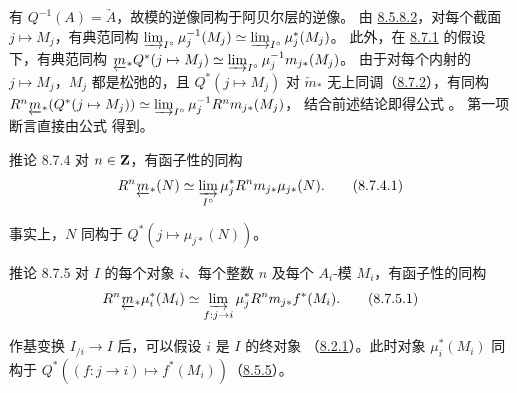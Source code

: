 有 $Q^{-1}(A)=\underrightarrow{A}$，故模的逆像同构于阿贝尔层的逆像。
由 \hyperref[VI.eq8.5.8.2]{8.5.8.2}，对每个截面 $j\mapsto M_j$，有典范同构
$\varinjlim_{I^{\circ}}\mu^{-1}_j(M_j)\simeq \varinjlim_{I^{\circ}}\mu^{\ast}_j(M_j)$。
此外，在 \hyperref[VI.subsubsec8.7.1]{8.7.1} 的假设下，有典范同构
$\underleftarrow{m}_{\ast}Q^{\ast}(j\mapsto M_j)\simeq \varinjlim_{I^{\circ}}\mu^{-1}_jm_{j\ast}(M_j)$。
由于对每个内射的 $j\mapsto M_j$，$M_j$ 都是松弛的，且 $Q^{\ast}(j\mapsto M_j)$
对 $\underleftarrow{m}_{\ast}$ 无上同调（\hyperref[VI.lem8.7.2]{8.7.2}），有同构
$R^n\underleftarrow{m}_{\ast}(Q^{\ast}(j\mapsto M_j))\simeq \varinjlim_{I^{\circ}}\mu^{-1}_jR^nm_{j\ast}(M_j)$，
结合前述结论即得公式 。
第一项断言直接由公式  得到。

\begin{enonce*}{推论 8.7.4}
对\pageoriginale{} $n\in\mathbf{Z}$，有函子性的同构
\begin{equation*}
R^n \underleftarrow{m}_{\ast} (N) \simeq \varinjlim_{I^{\circ}}
\mu^{\ast}_j R^n m_{j\ast} \mu_{j\ast} (N){}.\tag{8.7.4.1}
\end{equation*}
\end{enonce*}

事实上，$N$ 同构于 $Q^{\ast}(j\mapsto\mu_{j\ast}(N))$。

\begin{enonce*}{推论 8.7.5}
对 $I$ 的每个对象 $i$、每个整数 $n$ 及每个 $A_i$-模 $M_i$，有函子性的同构
\begin{equation*}
R^n \underleftarrow{m}_{\ast} \mu^{\ast}_i (M_i) \simeq
\varinjlim_{f : j \to i} \mu^{\ast}_j R^n m_{j\ast} f^{\ast}
(M_i){\quoi}.\tag{8.7.5.1}
\end{equation*}
\end{enonce*}

作基变换 $I_{/i}\to I$ 后，可以假设 $i$ 是 $I$ 的终对象
（\hyperref[VI.lem8.2.1]{8.2.1}）。此时对象 $\mu_i^{\ast}(M_i)$ 同构于
$Q^{\ast}((f:j\to i)\mapsto f^{\ast}(M_i))$（\cf \hyperref[VI.cor8.5.5]{8.5.5}）。

